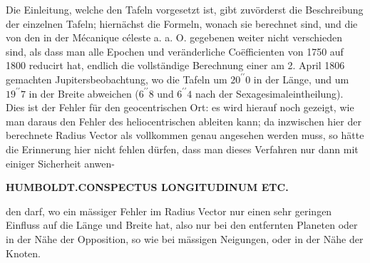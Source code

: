Die Einleitung, welche den Tafeln vorgesetzt ist, gibt zuvörderst die Beschreibung der einzelnen Tafeln; hiernächst die Formeln, wonach sie berechnet sind, und die von den in der Mécanique céleste a. a. O. gegebenen weiter nicht verschieden sind, als dass man alle Epochen und veränderliche Coëfficienten von 1750 auf 1800 reducirt hat, endlich die vollständige Berechnung einer am 2. April 1806 gemachten Jupitersbeobachtung, wo die Tafeln um $20^{\prime\prime}0$ in der Länge, und um $19^{\prime\prime}7$ in der Breite abweichen ($6^{\prime\prime}8$ und $6^{\prime\prime}4$ nach der Sexagesimaleintheilung). Dies ist der Fehler für den geocentrischen Ort: es wird hierauf noch gezeigt, wie man daraus den Fehler des heliocentrischen ableiten kann; da inzwischen hier der berechnete Radius Vector als vollkommen genau angesehen werden muss, so hätte die Erinnerung hier nicht fehlen dürfen, dass man dieses Verfahren nur dann mit einiger Sicherheit anwen-\par
\clearpage
\thispagestyle{empty}
\noindent{}%
\makebox[12mm][l]{{}}%
\parbox[t]{\dimexpr\linewidth-24mm\relax}{\centering\footnotesize\bfseries HUMBOLDT.\enspace CONSPECTUS LONGITUDINUM ETC.\par}%
\par\medskip
\noindent den darf, wo ein mässiger Fehler im Radius Vector nur einen sehr geringen Einfluss auf die Länge und Breite hat, also nur bei den entfernten Planeten oder in der Nähe der Opposition, so wie bei mässigen Neigungen, oder in der Nähe der Knoten.

